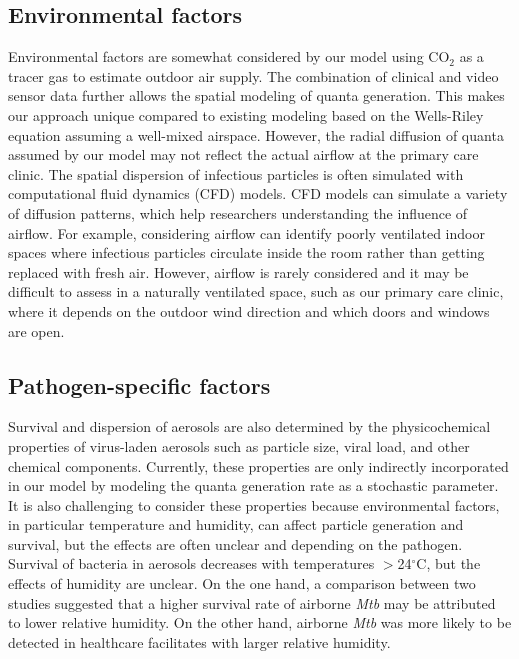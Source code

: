 \documentclass[fleqn,11pt]{wlscirep_supp}
\begin{document}
\subsection{Environmental factors}

Environmental factors are somewhat considered by our model using CO$_2$ as a tracer gas to estimate outdoor air supply. The combination of clinical and video sensor data further allows the spatial modeling of quanta generation. This makes our approach unique compared to existing modeling based on the Wells-Riley equation assuming a well-mixed airspace\cite{Riley1978AJE,Rudnick2003IndoorAir}. However, the radial diffusion of quanta assumed by our model may not reflect the actual airflow at the primary care clinic. The spatial dispersion of infectious particles is often simulated with computational fluid dynamics (CFD) models\cite{Vuorinen2020SafSci,Jung2021InfectChemo,Li2021BuildEnv}. CFD models can simulate a variety of diffusion patterns, which help researchers understanding the influence of airflow. For example, considering airflow can identify poorly ventilated indoor spaces where infectious particles circulate inside the room rather than getting replaced with fresh air\cite{Li2021BuildEnv}. However, airflow is rarely considered and it may be difficult to assess in a naturally ventilated space, such as our primary care clinic, where it depends on the outdoor wind direction and which doors and windows are open. 

\subsection{Pathogen-specific factors}

Survival and dispersion of aerosols are also determined by the physicochemical properties of virus-laden aerosols such as particle size, viral load, and other chemical components\cite{Wang2021Science}. Currently, these properties are only indirectly incorporated in our model by modeling the quanta generation rate as a stochastic parameter. It is also challenging to consider these properties because environmental factors, in particular temperature and humidity, can affect particle generation and survival, but the effects are often unclear and depending on the pathogen\cite{Songer1967,Chan2011AdvVir,Fernstrom2013JoP,Cox1995Book,Fernstrom2013JoP,Tang2009Interface}. Survival of bacteria in aerosols decreases with temperatures $>$24$^{\circ}$C, but the effects of humidity are unclear\cite{Tang2009Interface}. On the one hand, a comparison between two studies suggested that a higher survival rate of airborne \emph{Mtb} may be attributed to lower relative humidity\cite{Loudon1969AMRRD,Lever2000LettersAppliedMicrobio}. On the other hand, airborne \emph{Mtb} was more likely to be detected in healthcare facilitates with larger relative humidity\cite{Sornboot2019IJTLD,Matuka2021IJERP}.   
\end{document}
